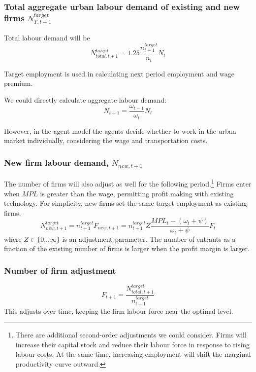 \subsubsection{Total aggregate urban labour demand of existing and new firms $N_{T,t+1}^{target}$} 
Total labour demand will be
\begin{equation}N_{total,t+1}^{target} = 1.25\frac{n^{target}_{t+1}}{n_{t}} N_t\end{equation}  

Target employment is used in  calculating  next period employment and wage premium.

We could  directly calculate aggregate labour demand:
\begin{equation}
  N_{t+1}= \frac {\omega_{t-1}} {\omega_{t}} N_t
\end{equation}

However, in the agent model the agents decide whether to work in the urban market individually, considering the wage and transportation costs.


\subsubsection{New firm labour demand,  $N_{new, t+1}$} 
The number of firms will also adjust as well for the following period.\footnote{There are additional second-order adjustments we could consider. Firms will increase their capital stock and reduce their labour force in response to rising labour costs. At the same time, increasing employment will shift the marginal productivity curve outward.}
Firms enter when $MPL$ is greater than the wage, %
permitting profit making with existing technology. For simplicity, new firms set the same target employment as existing firms. 
\begin{equation}N_{new, t+1}^{target} = n_{t+1}^{target} F_{new, t+1} = n_{t+1}^{target}Z\frac{MPL_t- (\omega_t + \psi)}{\omega_t +\psi}F_{t}\end{equation}
where $Z\in\{0\dots\infty\}$ is an adjustment parameter. The number of entrants as a fraction of the existing number of firms is larger when the profit margin is larger.

\subsubsection{Number of firm adjustment} 
\[F_{t+1}=\frac{N_{total,t+1}^{target}}{n^{target}_{t+1}}\] 
This adjusts over time, keeping the firm labour force near the optimal level. 

